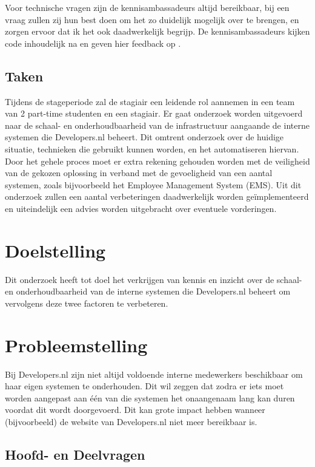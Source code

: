 Voor technische vragen zijn de kennisambassadeurs altijd bereikbaar, bij een vraag zullen zij hun best doen om het zo duidelijk mogelijk over te brengen, en zorgen ervoor dat ik het ook daadwerkelijk begrijp. De kennisambassadeurs kijken code inhoudelijk na en geven hier feedback op \parencite{Stageplan}.

\subsection{Taken}
Tijdens de stageperiode zal de stagiair een leidende rol aannemen in een team van 2 part-time studenten en een stagiair. Er gaat onderzoek worden uitgevoerd naar de schaal- en onderhoudbaarheid van de infrastructuur aangaande de interne systemen die Developers.nl beheert. Dit omtrent onderzoek over de huidige situatie, technieken die gebruikt kunnen worden, en het automatiseren hiervan. Door het gehele proces moet er extra rekening gehouden worden met de veiligheid van de gekozen oplossing in verband met de gevoeligheid van een aantal systemen, zoals bijvoorbeeld het Employee Management System (EMS). Uit dit onderzoek zullen een aantal verbeteringen daadwerkelijk worden geïmplementeerd en uiteindelijk een advies worden uitgebracht over eventuele vorderingen.

\section{Doelstelling}

Dit onderzoek heeft tot doel het verkrijgen van kennis en inzicht over de schaal- en onderhoudbaarheid van de interne systemen die Developers.nl beheert om vervolgens deze twee factoren te verbeteren.


\section{Probleemstelling}
Bij Developers.nl zijn niet altijd voldoende interne medewerkers beschikbaar om haar eigen systemen te onderhouden. Dit wil zeggen dat zodra er iets moet worden aangepast aan één van die systemen het onaangenaam lang kan duren voordat dit wordt doorgevoerd. Dit kan grote impact hebben wanneer (bijvoorbeeld) de website van Developers.nl niet meer bereikbaar is.

\subsection{Hoofd- en Deelvragen}
